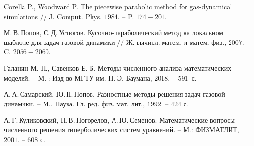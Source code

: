 \documentclass[12pt,a4paper]{article}
\begin{document}
    \begin{thebibliography}{9}
  
         Corella P., Woodward P. The piecewise parabolic method for gas-dynamical simulations // J. Comput. Phys. $1984$. -- P. $174-201$.
  
         М.\,В.\,Попов, С.\,Д.\,Устюгов. Кусочно-параболический метод на локальном шаблоне для задач газовой динамики // Ж. вычисл. матем. и матем. физ., $2007$. -- C. $2056-2060$.
  
         Галанин М. П., Савенков Е. Б. Методы численного анализа математических моделей. -- М. : Изд-во МГТУ им. Н. Э. Баумана, 2018. -- 591~с.

         А.\,А.\,Самарский, Ю.\,П.\,Попов. Разностные методы решения задач газовой динамики. -- M.: Наука. Гл. ред. физ. мат. лит., $1992$. -- $424$ с.

         А.\,Г.\,Куликовский, Н.\,В.\,Погорелов, А.\,Ю.\,Семенов. Математические вопросы численного решения гиперболических систем уравнений. -- М.: ФИЗМАТЛИТ, $2001$. -- $608$ с.
  
    \end{thebibliography}
\end{document}
